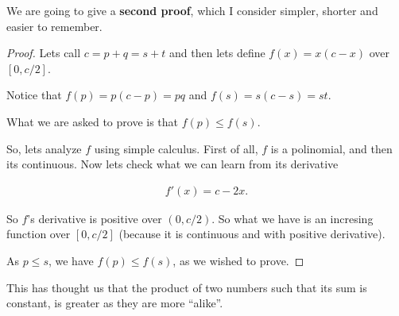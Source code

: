     We are going to give a \textbf{second proof}, which I consider simpler, shorter and easier to remember.
    
    \begin{proof}
        Lets call $c = p + q = s + t$ and then lets define $f(x) = x(c-x)$ over $[0, c/2]$.\pn
        
        Notice that $f(p) = p(c-p) = pq$ and $f(s) = s(c-s) = st$.\pn
            
        What we are asked to prove is that $f(p) \leq f(s)$.\pn
        
        So, lets analyze $f$ using simple calculus. First of all, $f$ is a polinomial, and then its continuous. Now
        lets check what we can learn from its derivative\pn
        
        \begin{align}
            f'(x) = c-2x.
        \end{align}\pn
        
        So $f$'s derivative is positive over $(0, c/2)$. So what we have is an incresing function over $[0, c/2]$ 
        (because it is continuous and with positive derivative).\pn 
        
        As $p \leq s$, we have $f(p) \leq f(s)$, as we wished to prove. 
    \end{proof}
    
        This has thought us that the product of two numbers such that its sum is constant, is greater as they are more
        ``alike''.